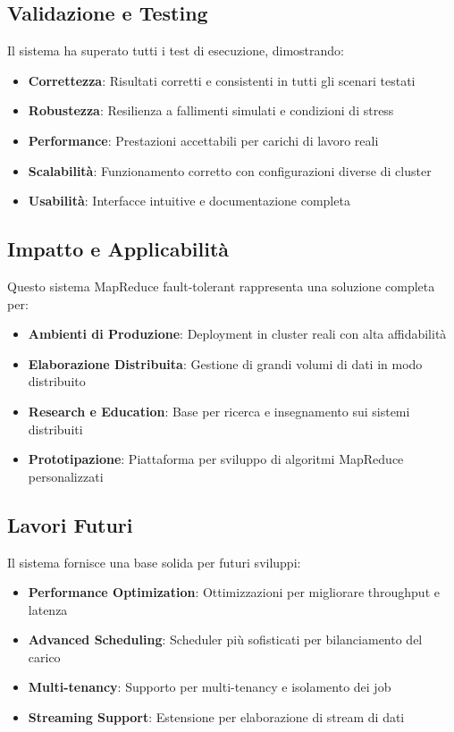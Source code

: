 \documentclass[12pt,a4paper]{article}
\begin{document}
\subsection{Validazione e Testing}

Il sistema ha superato tutti i test di esecuzione, dimostrando:

\begin{itemize}
\item \textbf{Correttezza}: Risultati corretti e consistenti in tutti gli scenari testati
\item \textbf{Robustezza}: Resilienza a fallimenti simulati e condizioni di stress
\item \textbf{Performance}: Prestazioni accettabili per carichi di lavoro reali
\item \textbf{Scalabilità}: Funzionamento corretto con configurazioni diverse di cluster
\item \textbf{Usabilità}: Interfacce intuitive e documentazione completa
\end{itemize}

\subsection{Impatto e Applicabilità}

Questo sistema MapReduce fault-tolerant rappresenta una soluzione completa per:

\begin{itemize}
\item \textbf{Ambienti di Produzione}: Deployment in cluster reali con alta affidabilità
\item \textbf{Elaborazione Distribuita}: Gestione di grandi volumi di dati in modo distribuito
\item \textbf{Research e Education}: Base per ricerca e insegnamento sui sistemi distribuiti
\item \textbf{Prototipazione}: Piattaforma per sviluppo di algoritmi MapReduce personalizzati
\end{itemize}

\subsection{Lavori Futuri}

Il sistema fornisce una base solida per futuri sviluppi:

\begin{itemize}
\item \textbf{Performance Optimization}: Ottimizzazioni per migliorare throughput e latenza
\item \textbf{Advanced Scheduling}: Scheduler più sofisticati per bilanciamento del carico
\item \textbf{Multi-tenancy}: Supporto per multi-tenancy e isolamento dei job
\item \textbf{Streaming Support}: Estensione per elaborazione di stream di dati
\end{itemize}
\end{document}
